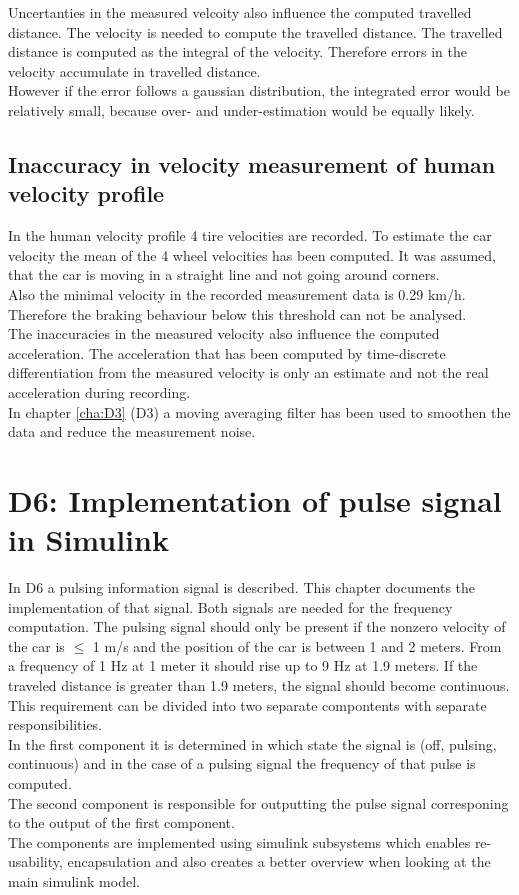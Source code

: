 Uncertanties in the measured velcoity also influence the computed travelled distance.
The velocity is needed to compute the travelled distance. The travelled distance is computed as the integral of the velocity. Therefore errors in the velocity accumulate in travelled distance.\\
However if the error follows a gaussian distribution, the integrated error would be relatively small, because over- and under-estimation would be equally likely.

\section{Inaccuracy in velocity measurement of human velocity profile}
In the human velocity profile 4 tire velocities are recorded.
To estimate the car velocity the mean of the 4 wheel velocities has been computed.
It was assumed, that the car is moving in a straight line and not going around corners.\\
Also the minimal velocity in the recorded measurement data is 0.29 km/h.
Therefore the braking behaviour below this threshold can not be analysed.\\
The inaccuracies in the measured velocity also influence the computed acceleration.
The acceleration that has been computed by time-discrete differentiation from the measured velocity is only an estimate and not the real acceleration during recording.\\
In chapter \ref{cha:D3} (D3) a moving averaging filter has been used to smoothen the data and reduce the measurement noise.


\chapter{D6: Implementation of pulse signal in Simulink}\label{cha:D6}

In D6 a pulsing information signal is described. This chapter documents the implementation of that signal.
Both signals are needed for the frequency computation.
The pulsing signal should only be present if the nonzero velocity of the car is $\leq$ 1 m/s and the position of the car is between 1 and 2 meters. From a frequency of 1 Hz at 1 meter it should rise up to 9 Hz at 1.9 meters. If the traveled distance is greater than 1.9 meters, the signal should become continuous.\\
This requirement can be divided into two separate compontents with separate responsibilities.\\
In the first component it is determined in which state the signal is (off, pulsing, continuous) and in the case of a pulsing signal the frequency of that pulse is computed.\\
The second component is responsible for outputting the pulse signal corresponing to the output of the first component.\\
The components are implemented using simulink subsystems which enables re-usability, encapsulation and also creates a better overview when looking at the main simulink model.\\
